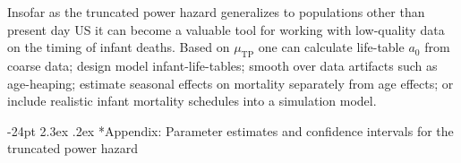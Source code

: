 \documentclass[10pt, twoside, parskip=half]{article}
\makeatletter
\renewcommand\section{\@startsection {section}{1}{\z@}%
                                   {-24pt}%
                                   {2.3ex \@plus.2ex}%
                                   {\normalfont\large\bfseries}}
\makeatother
\begin{document}
Insofar as the truncated power hazard generalizes to populations other
than present day US it can become a valuable tool for working with
low-quality data on the timing of infant deaths. Based on
\(\mu_\text{TP}\) one can calculate life-table \(a_0\) from coarse data;
design model infant-life-tables; smooth over data artifacts such as
age-heaping; estimate seasonal effects on mortality separately from age
effects; or include realistic infant mortality schedules into a
simulation model.

\clearpage

\section*{Appendix: Parameter estimates and confidence intervals for the
truncated power
hazard}\label{appendix-parameter-estimates-and-confidence-intervals-for-the-truncated-power-hazard}
\end{document}
